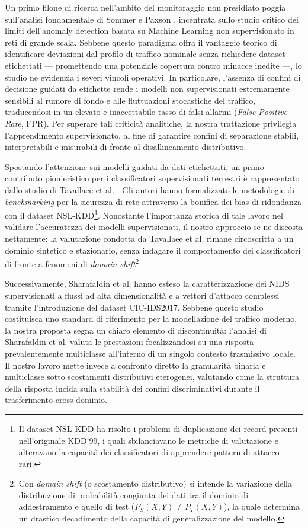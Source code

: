 Un primo filone di ricerca nell'ambito del monitoraggio non presidiato poggia sull'analisi fondamentale di Sommer e Paxson \cite{sommer2010}, incentrata sullo studio critico dei limiti dell'anomaly detection basata su Machine Learning non supervisionato in reti di grande scala. 
Sebbene questo paradigma offra il vantaggio teorico di identificare deviazioni dal profilo di traffico nominale senza richiedere dataset etichettati — promettendo una potenziale copertura contro minacce inedite —, lo studio ne evidenzia i severi vincoli operativi. 
In particolare, l'assenza di confini di decisione guidati da etichette rende i modelli non supervisionati estremamente sensibili al rumore di fondo e alle fluttuazioni stocastiche del traffico, traducendosi in un elevato e inaccettabile tasso di falsi allarmi (\textit{False Positive Rate}, FPR). 
Per superare tali criticità analitiche, la nostra trattazione privilegia l'apprendimento supervisionato, al fine di garantire confini di separazione stabili, interpretabili e misurabili di fronte al disallineamento distributivo.

Spostando l'attenzione sui modelli guidati da dati etichettati, un primo contributo pionieristico per i classificatori supervisionati terrestri è rappresentato dallo studio di Tavallaee et al. \cite{tavallaee2009}. 
Gli autori hanno formalizzato le metodologie di \textit{benchmarking} per la sicurezza di rete attraverso la bonifica dei bias di ridondanza con il dataset NSL-KDD\footnote{Il dataset NSL-KDD ha risolto i problemi di duplicazione dei record presenti nell'originale KDD'99, i quali sbilanciavano le metriche di valutazione e alteravano la capacità dei classificatori di apprendere pattern di attacco rari.}. 
Nonostante l'importanza storica di tale lavoro nel validare l'accuratezza dei modelli supervisionati, il nostro approccio se ne discosta nettamente: la valutazione condotta da Tavallaee et al. rimane circoscritta a un dominio sintetico e stazionario, senza indagare il comportamento dei classificatori di fronte a fenomeni di \textit{domain shift}\footnote{Con \textit{domain shift} (o scostamento distributivo) si intende la variazione della distribuzione di probabilità congiunta dei dati tra il dominio di addestramento e quello di test ($P_S(X, Y) \neq P_T(X,Y)$), la quale determina un drastico decadimento della capacità di generalizzazione del modello.}.

Successivamente, Sharafaldin et al. \cite{sharafaldin2018} hanno esteso la caratterizzazione dei NIDS supervisionati a flussi ad alta dimensionalità e a vettori d'attacco complessi tramite l'introduzione del dataset CIC-IDS2017. 
Sebbene questo studio costituisca uno standard di riferimento per la modellazione del traffico moderno, la nostra proposta segna un chiaro elemento di discontinuità: l'analisi di Sharafaldin et al. valuta le prestazioni focalizzandosi su una risposta prevalentemente multiclasse all'interno di un singolo contesto trasmissivo locale. 
Il nostro lavoro mette invece a confronto diretto la granularità binaria e multiclasse sotto scostamenti distributivi eterogenei, valutando come la struttura della risposta incida sulla stabilità dei confini discriminativi durante il trasferimento cross-dominio.

